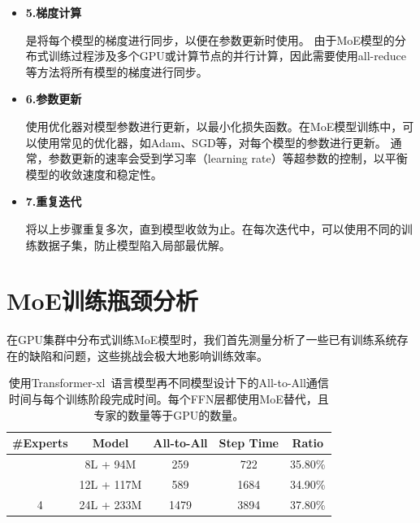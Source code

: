 \begin{itemize}
    \item \textbf{5.梯度计算}
    
    是将每个模型的梯度进行同步，以便在参数更新时使用。
    由于MoE模型的分布式训练过程涉及多个GPU或计算节点的并行计算，因此需要使用all-reduce等方法将所有模型的梯度进行同步。

    \item \textbf{6.参数更新}
    
    使用优化器对模型参数进行更新，以最小化损失函数。在MoE模型训练中，可以使用常见的优化器，如Adam、SGD等，对每个模型的参数进行更新。
    通常，参数更新的速率会受到学习率（learning rate）等超参数的控制，以平衡模型的收敛速度和稳定性。

    \item \textbf{7.重复迭代}
    
    将以上步骤重复多次，直到模型收敛为止。在每次迭代中，可以使用不同的训练数据子集，防止模型陷入局部最优解。

\end{itemize}

\section{MoE训练瓶颈分析}

在GPU集群中分布式训练MoE模型时，我们首先测量分析了一些已有训练系统存在的缺陷和问题，这些挑战会极大地影响训练效率。

\begin{table}[]
    \centering
    \label{table-moti}
    \caption{使用Transformer-xl~语言模型再不同模型设计下的All-to-All通信时间与每个训练阶段完成时间。每个FFN层都使用MoE替代，且专家的数量等于GPU的数量。}
\begin{tabular}{ccccc}
\hline
\cellcolor[HTML]{FFFFFF}\#Experts & Model      & All-to-All & Step Time & Ratio                           \\ \hline
                                  & 8L + 94M   & 259        & 722       & \cellcolor[HTML]{FFFFFF}35.80\% \\
                                  & 12L + 117M & 589        & 1684      & \cellcolor[HTML]{FFFFFF}34.90\% \\
\multirow{-3}{*}{4}               & 24L + 233M & 1479       & 3894      & \cellcolor[HTML]{FFFFFF}37.80\% \\ \hline
\end{tabular}
    \end{table}



